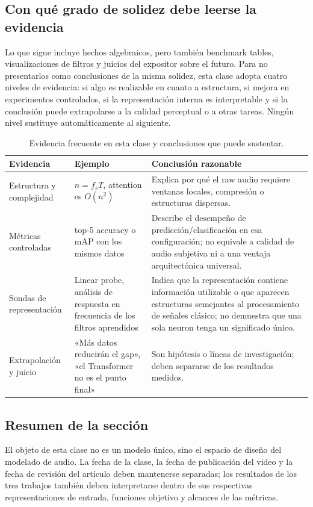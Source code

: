 \subsection{Con qué grado de solidez debe leerse la evidencia}

Lo que sigue incluye hechos algebraicos, pero también benchmark tables, visualizaciones de filtros y juicios del expositor sobre el futuro. Para no presentarlos como conclusiones de la misma solidez, esta clase adopta cuatro niveles de evidencia: si algo es realizable en cuanto a estructura, si mejora en experimentos controlados, si la representación interna es interpretable y si la conclusión puede extrapolarse a la calidad perceptual o a otras tareas. Ningún nivel sustituye automáticamente al siguiente.

\begin{table}[H]
\centering
\small
\caption{Evidencia frecuente en esta clase y conclusiones que puede sustentar.}
\begin{tabularx}{\textwidth}{L{0.21\textwidth}L{0.29\textwidth}X}
\toprule
Evidencia & Ejemplo & Conclusión razonable \\
\midrule
Estructura y complejidad & $n=f_sT$, attention es $O(n^2)$ & Explica por qué el raw audio requiere ventanas locales, compresión o estructuras dispersas. \\
Métricas controladas & top-5 accuracy o mAP con los mismos datos & Describe el desempeño de predicción/clasificación en esa configuración; no equivale a calidad de audio subjetiva ni a una ventaja arquitectónica universal. \\
Sondas de representación & Linear probe, análisis de respuesta en frecuencia de los filtros aprendidos & Indica que la representación contiene información utilizable o que aparecen estructuras semejantes al procesamiento de señales clásico; no demuestra que una sola neuron tenga un significado único. \\
Extrapolación y juicio & «Más datos reducirán el gap», «el Transformer no es el punto final» & Son hipótesis o líneas de investigación; deben separarse de los resultados medidos. \\
\bottomrule
\end{tabularx}
\end{table}

\subsection{Resumen de la sección}

El objeto de esta clase no es un modelo único, sino el espacio de diseño del modelado de audio. La fecha de la clase, la fecha de publicación del video y la fecha de revisión del artículo deben mantenerse separadas; los resultados de los tres trabajos también deben interpretarse dentro de sus respectivas representaciones de entrada, funciones objetivo y alcances de las métricas.
